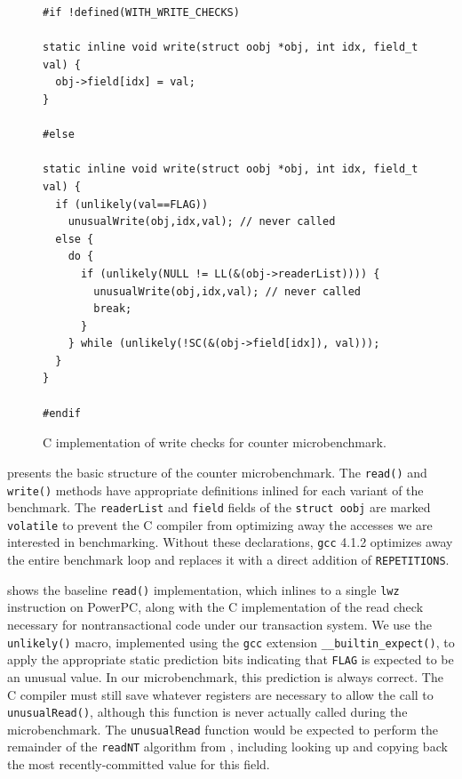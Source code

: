 \begin{figure}
\sis\fontsize{9}{10}\begin{verbatim}
#if !defined(WITH_WRITE_CHECKS)

static inline void write(struct oobj *obj, int idx, field_t val) {
  obj->field[idx] = val;
}

#else

static inline void write(struct oobj *obj, int idx, field_t val) {
  if (unlikely(val==FLAG))
    unusualWrite(obj,idx,val); // never called
  else {
    do {
      if (unlikely(NULL != LL(&(obj->readerList)))) {
        unusualWrite(obj,idx,val); // never called
        break;
      }
    } while (unlikely(!SC(&(obj->field[idx]), val)));
  }
}

#endif
\end{verbatim}
\caption{C implementation of write checks for counter microbenchmark.}
\label{fig:counter-write}
\end{figure}

 presents the basic structure of the counter
microbenchmark. The \texttt{read()} and \texttt{write()} methods
have appropriate definitions inlined for each variant of the
benchmark.  The \texttt{readerList} and \texttt{field}
fields of the \texttt{struct oobj} are marked \texttt{volatile} to
prevent the C compiler from optimizing away the accesses we are
interested in benchmarking.  Without these declarations, \texttt{gcc}
4.1.2 optimizes away the entire benchmark loop and replaces it with
a direct addition of \texttt{REPETITIONS}\@.

 shows the baseline \texttt{read()}
implementation, which inlines to a single \texttt{lwz} instruction on
PowerPC, along with the C implementation of the read check necessary
for nontransactional code under our transaction system.  We use 
the \texttt{unlikely()} macro, implemented using the
\texttt{gcc} extension \texttt{\_\_builtin\_expect()}, to apply the
appropriate static prediction bits indicating that \texttt{FLAG} is
expected to be an unusual value.  In our microbenchmark, this
prediction is always correct.  The C compiler must still save
whatever registers are necessary to allow the call to
\texttt{unusualRead()}, although this function is never actually called
during the microbenchmark.  The \texttt{unusualRead} function would be
expected to perform the remainder of the \texttt{readNT} algorithm
from , including looking up and copying back the most
recently-committed value for this field.

